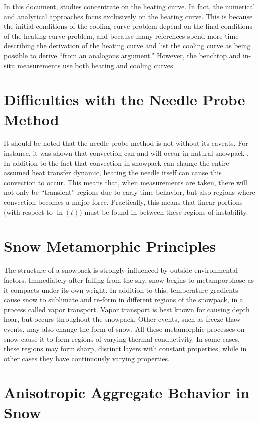 In this document, studies concentrate on the heating curve. In fact, the
numerical and analytical approaches focus exclusively on the heating curve. This
is because the initial conditions of the cooling curve problem depend on the
final conditions of the heating curve problem, and because many references spend
more time describing the derivation of the heating curve and list the cooling
curve as being possible to derive ``from an analogous argument.'' However, the
benchtop and in-situ measurements use both heating and cooling curves.

\section{Difficulties with the Needle Probe Method}

It should be noted that the needle probe method is not without its caveats. For
instance, it was shown that convection can and will occur in natural snowpack
\cite{sturm3}. In addition to the fact that convection in snowpack can change the
entire assumed heat transfer dynamic, heating the needle itself can cause this
convection to occur. This means that, when measurements are taken, there will
not only be ``transient'' regions due to early-time behavior, but also regions
where convection becomes a major force. Practically, this means that linear
portions (with respect to \(\ln(t)\)) must be found in between these regions
of instability.

\section{Snow Metamorphic Principles}
\label{sec:introduction:metamorphic}

The structure of a snowpack is strongly influenced by outside environmental
factors. Immediately after falling from the sky, snow begins to metamporphose as
it compacts under its own weight. In addition to this, temperature gradients
cause snow to sublimate and re-form in different regions of the snowpack, in a
process called vapor transport. Vapor transport is best known for causing
depth hoar, but occurs throughout the snowpack. Other events, such as
freeze-thaw events, may also change the form of snow. All these metamorphic
processes on snow cause it to form regions of varying thermal conductivity. In
some cases, these regions may form sharp, distinct layers with constant
properties, while in other cases they have continuously varying properties.

\section{Anisotropic Aggregate Behavior in Snow}


